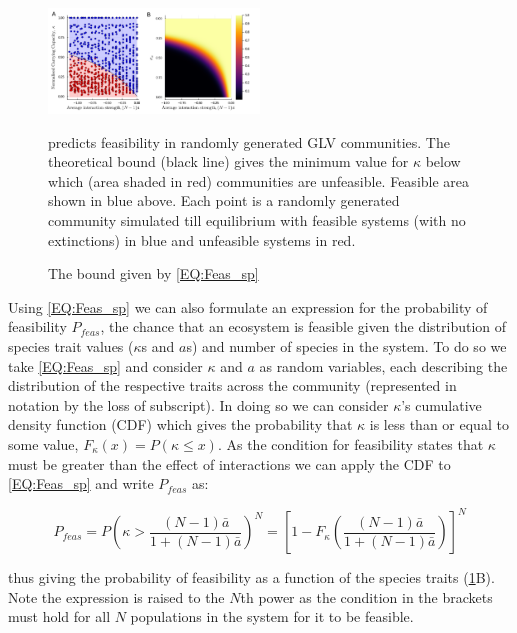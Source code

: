 \documentclass{article}
\begin{document}
\begin{figure}[h] 
    \centering
    \includegraphics[width = 0.5\textwidth]{docs/Figures/Fig_1.pdf}
    \caption[width = 0.1\textwidth]{The bound given by \cref{EQ:Feas_sp}} predicts feasibility in randomly generated GLV communities. The theoretical bound (black line) gives the minimum value for $\kappa$ below which (area shaded in red) communities are unfeasible. Feasible area shown in blue above. Each point is a randomly generated community simulated till equilibrium with feasible systems (with no extinctions) in blue and unfeasible systems in red. 
    \label{Fig:Feasability_Bound}
\end{figure}

Using \cref{EQ:Feas_sp} we can also formulate an expression for the probability of feasibility $P_{feas}$, the chance that an ecosystem is feasible given the distribution of species trait values ($\kappa$s and $a$s) and number of species in the system. To do so we take \cref{EQ:Feas_sp} and consider $\kappa$ and $a$ as random variables, each describing the distribution of the respective traits across the community (represented in notation by the loss of subscript). In doing so we can consider $\kappa$'s cumulative density function (CDF) which gives the probability that $\kappa$ is less than or equal to some value, $F_{\kappa}(x) = P(\kappa \leq x)$. As the condition for feasibility states that $\kappa$ must be greater than the effect of interactions we can apply the CDF to \cref{EQ:Feas_sp} and write $P_{feas}$ as:

\begin{equation} \label{EQ:P_feas}
    P_{feas} = P \left( \kappa > \frac{(N-1)\bar{a}}{1 + (N-1)\bar{a}}  \right)^N = 
    \left[1 - F_{\kappa}\left(\frac{(N-1)\bar{a}}{1 + (N-1)\bar{a}}\right)\right]^N
\end{equation}

thus giving the probability of feasibility as a function of the species traits (\cref{Fig:Feasability_Bound}B). Note the expression is raised to the $N$th power as the condition in the brackets must hold for all $N$ populations in the system for it to be feasible. 
\end{document}
